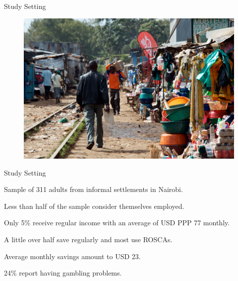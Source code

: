 \documentclass[aspectratio=169]{beamer}
\newenvironment{wideitemize}{\itemize\addtolength{\itemsep}{10pt}}{\enditemize}
\begin{document}
\begin{frame}{Study Setting}

	\begin{figure}[H]
		\centering
		\includegraphics[height=0.8\textheight]{kibera-tracks.jpg}
	\end{figure}


\end{frame}

\begin{frame}{Study Setting}

	Sample of 311 adults from informal settlements in Nairobi.

	\begin{wideitemize}
		\item Less than half of the sample consider themselves employed.
		\item Only 5\% receive regular income with an average of USD PPP 77 monthly.
		\item A little over half save regularly and most use ROSCAs.
		\item Average monthly savings amount to USD 23.
		\item 24\% report having gambling problems.
	\end{wideitemize}


\end{frame}
\end{document}
